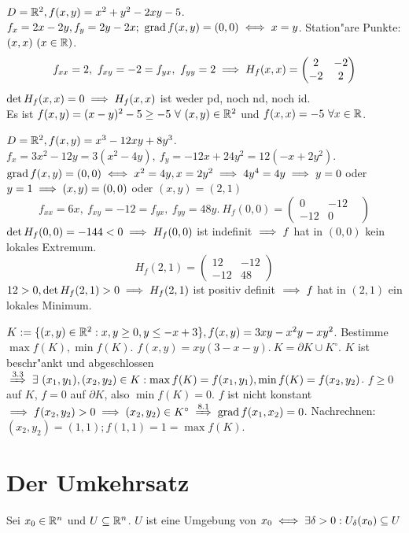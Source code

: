 \documentclass[a4paper,twoside,DIV15,BCOR12mm,chapterprefix=true,headings=twolinechapter]{scrbook}
\begin{document}
\begin{beispiele}
\item $D=\mathbb{R}^2, f(x,y)=x^2+y^2-2xy-5$. $f_x=2x-2y, f_y=2y-2x;\ \grad f(x,y)=(0,0)\equizu x=y$. Station"are Punkte: $(x,x)\ (x\in\mathbb{R})$.\\
$$f_{xx}=2,\ f_{xy}=-2=f_{yx},\ f_{yy}=2\folgt H_f(x,x)=\begin{pmatrix}2&-2\\-2&2\end{pmatrix}$$
$\det H_f(x,x)=0\implies H_f(x,x)$ ist weder pd, noch nd, noch id.\\
Es ist $f(x,y)=(x-y)^2-5\ge -5\ \forall\ (x,y)\in\MdR^2$ und $f(x,x)=-5\ \forall x\in\mathbb{R}$.
\item $D=\mathbb{R}^2, f(x,y)=x^3-12xy+8y^3$.\\
$f_x=3x^2-12y=3(x^2-4y),\ f_y=-12x+24y^2=12(-x+2y^2)$. $\grad f(x,y)=(0,0)\equizu x^2=4y, x=2y^2\folgt 4y^4=4y\folgt y=0$ oder $y=1\implies (x,y)=(0,0)$ oder $(x,y)=(2,1)$\\
$$f_{xx}=6x,\ f_{xy}=-12=f_{yx},\ f_{yy}=48y.\ H_f(0,0)=\begin{pmatrix}0&-12&\\-12&0\end{pmatrix}$$
$\det H_f(0,0)=-144<0\implies H_f(0,0)$ ist indefinit $\implies f$ hat in $(0,0)$ kein lokales Extremum. 
$$H_f(2,1)=\begin{pmatrix}12&-12\\-12&48\end{pmatrix}$$
$12>0, \det H_f(2,1)>0\implies H_f(2,1)$ ist positiv definit $\implies f$ hat in $(2,1)$ ein lokales Minimum.
\item $K:=\{(x,y)\in\mathbb{R}^2: x,y\ge 0, y\le -x+3\}, f(x,y)=3xy-x^2y-xy^2$. Bestimme $\max f(K), \min f(K)$. $f(x,y)=xy(3-x-y).\ K=\partial K \cup K^\circ$. $K$ ist beschr"ankt und abgeschlossen $\folgtnach{3.3}\exists\ (x_1,y_1), (x_2,y_2)\in K: \max f(K)=f(x_1, y_1), \min f(K)=f(x_2,y_2)$. $f\ge 0$ auf $K$, $f=0$ auf $\partial K$, also $\min f(K)=0$. $f$ ist nicht konstant $\folgt f(x_2,y_2)>0\folgt (x_2,y_2)\in K^\circ\folgtnach{8.1}\grad f(x_1,x_2)=0$. Nachrechnen: $(x_2,y_2)=(1,1); f(1,1)=1=\max f(K)$.
\end{beispiele}

\chapter{Der Umkehrsatz}
\def\grad{\mathop{\rm grad}\nolimits}

\begin{erinnerung}
Sei $x_0\in\mathbb{R}^n$ und $U\subseteq\mathbb{R}^n$. $U$ ist eine Umgebung von $x_0\iff\exists\delta>0:U_\delta(x_0)\subseteq U$
\end{erinnerung}
\end{document}
